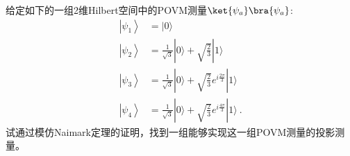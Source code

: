 \begin{exercise}{}
给定如下的一组2维Hilbert空间中的POVM测量$\ket{\psi_a}\bra{\psi_a}$:
\begin{equation}
\begin{aligned}
\left|\psi_1\right\rangle & =|0\rangle \\
\left|\psi_2\right\rangle & =\frac{1}{\sqrt{3}}|0\rangle+\sqrt{\frac{2}{3}}|1\rangle \\
\left|\psi_3\right\rangle & =\frac{1}{\sqrt{3}}|0\rangle+\sqrt{\frac{2}{3}} e^{i \frac{2 \pi}{3}}|1\rangle \\
\left|\psi_4\right\rangle & =\frac{1}{\sqrt{3}}|0\rangle+\sqrt{\frac{2}{3}} e^{i \frac{4 \pi}{3}}|1\rangle~.
\end{aligned}
\end{equation}
试通过模仿Naimark定理的证明，找到一组能够实现这一组POVM测量的投影测量。
\end{exercise}

